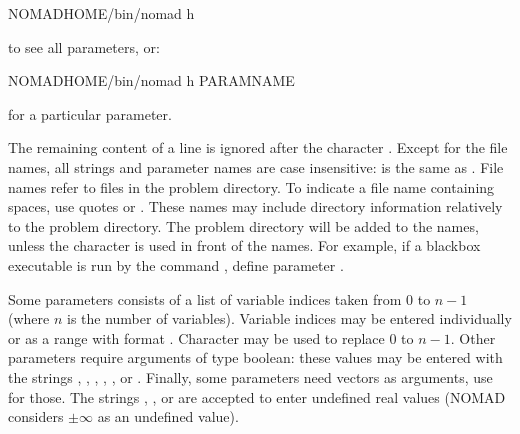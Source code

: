 \documentclass[letterpaper,10pt,english]{sphinxmanual}
\begin{document}
\begin{sphinxVerbatim}[commandchars=\\\{\}]
\PYGZdl{}NOMAD\PYGZus{}HOME/bin/nomad \PYGZhy{}h
\end{sphinxVerbatim}

\sphinxAtStartPar
to see all parameters, or:

\begin{sphinxVerbatim}[commandchars=\\\{\}]
\PYGZdl{}NOMAD\PYGZus{}HOME/bin/nomad \PYGZhy{}h PARAM\PYGZus{}NAME
\end{sphinxVerbatim}

\sphinxAtStartPar
for a particular parameter.

\sphinxAtStartPar
The remaining content of a line is ignored after the character \sphinxcode{\sphinxupquote{\#}}. Except for the file names, all strings and parameter names are case insensitive:  is the same as . File names refer to files in the problem directory. To indicate a file name containing spaces, use quotes  or . These names may include directory information relatively to the problem directory. The problem directory will be added to the names, unless the \sphinxcode{\sphinxupquote{\$}} character is used in front of the names. For example, if a blackbox executable is run by the command , define parameter .

\sphinxAtStartPar
Some parameters consists of a list of variable indices taken from 0 to \(n-1\)  (where \(n\) is the number of variables). Variable indices may be entered individually or as a range  with format . Character \sphinxcode{\sphinxupquote{*}} may be used to replace 0 to \(n-1\). Other parameters require arguments of type boolean: these values  may be entered with the strings , , , ,  , or . Finally, some parameters need vectors as arguments,  use  for those. The strings \sphinxcode{\sphinxupquote{\sphinxhyphen{}}}, ,  or   are accepted to enter undefined real values  (NOMAD considers \(\pm \infty\) as an undefined value).
\end{document}
